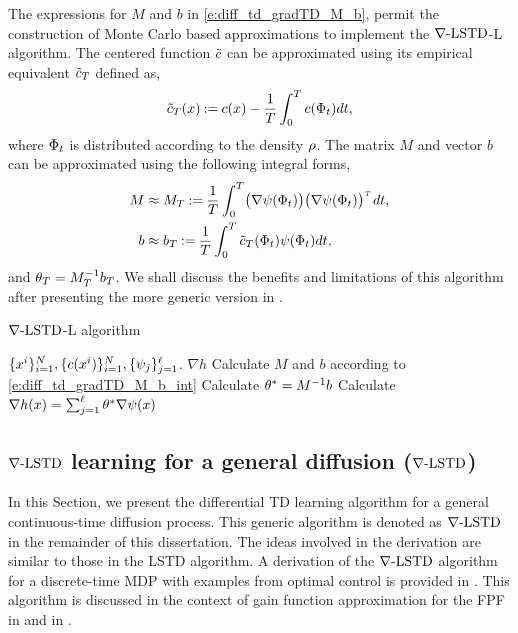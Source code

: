 The expressions for $M$ and $b$ in \eqref{e:diff_td_gradTD_M_b}, permit the construction of Monte Carlo based approximations to implement the $\nabla\text{-LSTD}$-L algorithm. The centered function $\tilde c$ can be approximated using its empirical equivalent $\tilde c_T$ defined as,
\begin{equation}
\tilde c_T(x) \mathbin{:=} c(x) - \frac{1}{T} \int_0^T c(\Phi_t) dt,
\end{equation}
where $\Phi_t$ is distributed according to the density $\rho$. The matrix $M$ and vector $b$ can be approximated using the following integral forms,
\begin{align}
M &\approx M_T \eqdef \frac{1}{T}\int_0^T\bigl(\gradbasis (\markovstate_t)\bigr)\bigl(\gradbasis (\markovstate_t)\bigr)^{\transpose}\, dt, \\
b &\approx b_T \eqdef \frac{1}{T} \int_0^T \tilc_T(\markovstate_t) \basis(\markovstate_t) dt,
\label{e:diff_td_gradTD_M_b_int}
\end{align}
and $\theta_T = M_T^{-1} b_T$. 
We shall discuss the benefits and limitations of this algorithm after presenting the more generic version in . 

\begin{algorithm}{$\nabla\text{-LSTD}$-L algorithm}
	\begin{algorithmic}[1]
		\Require $\{x^i\}_{i=1}^N, \{c(x^i)\}_{i=1}^N, \{\psi_j\}_{j=1}^{\ell}$.
		\Ensure $\nabla h$
		\State Calculate $M$ and $b$ according to \eqref{e:diff_td_gradTD_M_b_int}
		\State Calculate $\theta^* = M^{-1}b$
		\State Calculate $\nabla h(x)  =  \sum_{j=1}^{\ell}  \theta^* \nabla \psi(x)$  
	\end{algorithmic}
\end{algorithm} 

\subsection{$\nabla\text{-LSTD}$ learning for a general diffusion ($\nabla\text{-LSTD}$)}
\label{s:diff_td_learning}
In this Section, we present the differential TD learning algorithm for a general continuous-time diffusion process. This generic algorithm is denoted as $\nabla\text{-LSTD}$ in the remainder of this dissertation.
The ideas involved in the derivation are similar to those in the LSTD algorithm.  A derivation of the $\nabla\text{-LSTD}$ algorithm for a discrete-time MDP with examples from optimal control is provided in \cite{devmey16arXiv}. This algorithm is discussed in the context of gain function approximation for the FPF in  and in \cite{raddevmey16}. 

